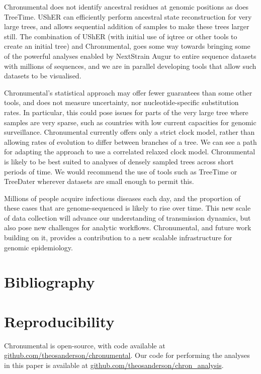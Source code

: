 Chronumental does not identify ancestral residues at genomic positions as does TreeTime. UShER \citep{Turakhia2021-la} can efficiently perform ancestral state reconstruction for very large trees, and allows sequential addition of samples to make these trees larger still. The combination of UShER (with initial use of iqtree \citep{Minh2020-vc} or other tools to create an initial tree) and Chronumental, goes some way towards bringing some of the powerful analyses enabled by NextStrain Augur \citep{Hadfield2018-fb} to entire sequence datasets with millions of sequences, and we are in parallel developing tools \citep{taxonium} that allow such datasets to be visualised.

Chronumental's statistical approach may offer fewer guarantees than some other tools, and does not measure uncertainty, nor nucleotide-specific substitution rates. In particular, this could pose issues for parts of the very large tree where samples are very sparse, such as countries with low current capacities for genomic surveillance. Chronumental currently offers only a strict clock model, rather than allowing rates of evolution to differ between branches of a tree. We can see a path for adapting the approach to use a correlated relaxed clock model. Chronumental is likely to be best suited to analyses of densely sampled trees across short periods of time. We would recommend the use of tools such as TreeTime or TreeDater wherever datasets are small enough to permit this.

Millions of people acquire infectious diseases each day, and the proportion of these cases that are genome-sequenced is likely to rise over time. This new scale of data collection will advance our understanding of transmission dynamics, but also pose new challenges for analytic workflows. Chronumental, and future work building on it, provides a contribution to a new scalable infrastructure for genomic epidemiology.






\section*{Bibliography}





\section*{Reproducibility}
Chronumental is open-source, with code available at \url{github.com/theosanderson/chronumental}. Our code for performing the analyses in this paper is available at \url{github.com/theosanderson/chron_analysis}.

